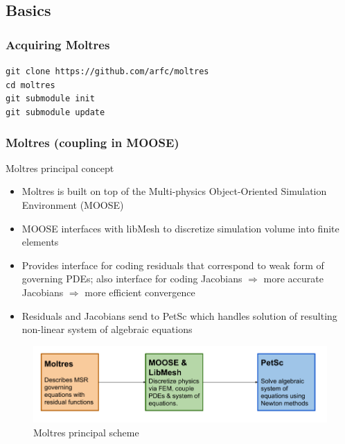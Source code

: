 \subsection{Basics}
\begin{frame}
        \frametitle{Acquiring Moltres}
             \texttt{git clone https://github.com/arfc/moltres}\\
        \texttt{cd moltres}\\
        \texttt{git submodule init}\\
        \texttt{git submodule update}\\
\end{frame}



\begin{frame}
  \frametitle{Moltres (coupling in MOOSE)}
   \begin{block}{Moltres principal concept \cite{lindsay_introduction_2018}}
     \begin{itemize}
        \item Moltres is built on top of the Multi-physics Object-Oriented
Simulation Environment (MOOSE)
		\item MOOSE interfaces with libMesh to discretize simulation volume
into finite elements
		\item Provides interface for coding residuals that correspond to weak
form of governing PDEs; also interface for coding Jacobians $\Rightarrow$
more accurate Jacobians $\Rightarrow$ more efficient convergence
		\item Residuals and Jacobians send to PetSc which handles solution of resulting non-linear system of algebraic equations
     \end{itemize}
    \end{block}
               \begin{figure}[t]
                \vspace*{-0.15in}
                \includegraphics[height=0.24\textwidth]{./images/moltres-moose-diag.png}
                \vspace*{-0.1in}
                \caption{Moltres principal scheme}
               \end{figure}   
\end{frame}


